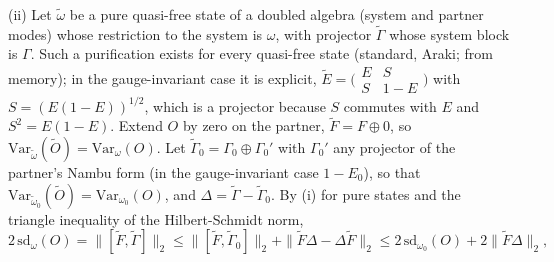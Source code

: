 (ii) Let $\widetilde\omega$ be a pure quasi-free state of a doubled algebra (system and partner modes) whose restriction to the system is $\omega$, with projector $\widetilde\Gamma$ whose system block is $\Gamma$. Such a purification exists for every quasi-free state (standard, Araki; from memory); in the gauge-invariant case it is explicit, $\widetilde E = \bigl(\begin{smallmatrix}E & S \\ S & 1 - E\end{smallmatrix}\bigr)$ with $S = (E(1 - E))^{1/2}$, which is a projector because $S$ commutes with $E$ and $S^{2} = E(1 - E)$. Extend $O$ by zero on the partner, $\widetilde F = F \oplus 0$, so $\mathrm{Var}_{\widetilde\omega}(\widetilde O) = \mathrm{Var}_{\omega}(O)$. Let $\widetilde\Gamma_{0} = \Gamma_{0} \oplus \Gamma_{0}'$ with $\Gamma_{0}'$ any projector of the partner's Nambu form (in the gauge-invariant case $1 - E_{0}$), so that $\mathrm{Var}_{\widetilde\omega_{0}}(\widetilde O) = \mathrm{Var}_{\omega_{0}}(O)$, and $\Delta = \widetilde\Gamma - \widetilde\Gamma_{0}$. By (i) for pure states and the triangle inequality of the Hilbert-Schmidt norm,
\[
2\,\mathrm{sd}_{\omega}(O) = \|[\widetilde F, \widetilde\Gamma]\|_{2} \le \|[\widetilde F, \widetilde\Gamma_{0}]\|_{2} + \|\widetilde F\Delta - \Delta\widetilde F\|_{2} \le 2\,\mathrm{sd}_{\omega_{0}}(O) + 2\|\widetilde F\Delta\|_{2},
\]
